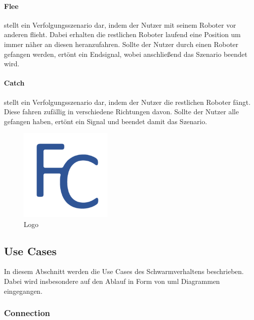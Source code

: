 \paragraph{Flee}

stellt ein Verfolgungsszenario dar, indem der Nutzer mit seinem Roboter vor anderen flieht. Dabei erhalten die restlichen Roboter laufend eine Position um immer näher an diesen heranzufahren. Sollte der Nutzer durch einen Roboter gefangen werden, ertönt ein Endsignal, wobei anschließend das Szenario beendet wird.

\paragraph{Catch}

stellt ein Verfolgungsszenario dar, indem der Nutzer die restlichen Roboter fängt. Diese fahren zufällig in verschiedene Richtungen davon. Sollte der Nutzer alle gefangen haben, ertönt ein Signal und beendet damit das Szenario.

\begin{figure}[h]
	\begin{center}
		\includegraphics[width=0.4\textwidth]{images/logos/UWP/FleeAndCatch_Logo.png}
	\end{center}
	\caption{Logo}
	\label{fig:Logo}
\end{figure}

\newpage
\subsection{Use Cases}

In diesem Abschnitt werden die Use Cases des Schwarmverhaltens beschrieben. Dabei wird insbesondere auf den Ablauf in Form von \gls{uml} Diagrammen eingegangen.

\subsubsection{Connection}

